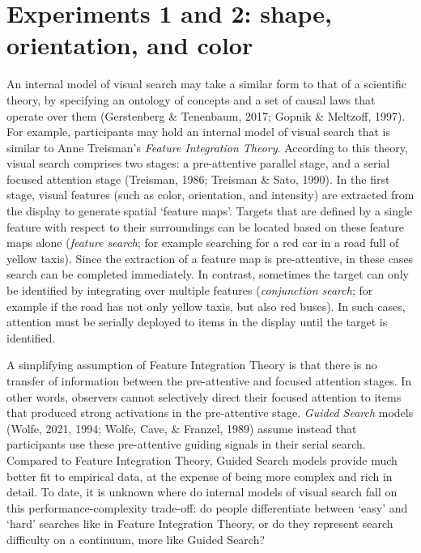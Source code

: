 \documentclass[12pt,twoside]{reedthesis}
\begin{document}
\hypertarget{experiments-1-and-2-shape-orientation-and-color}{%
\section{Experiments 1 and 2: shape, orientation, and color}\label{experiments-1-and-2-shape-orientation-and-color}}

An internal model of visual search may take a similar form to that of a scientific theory, by specifying an ontology of concepts and a set of causal laws that operate over them (Gerstenberg \& Tenenbaum, 2017; Gopnik \& Meltzoff, 1997). For example, participants may hold an internal model of visual search that is similar to Anne Treisman's \emph{Feature Integration Theory}. According to this theory, visual search comprises two stages: a pre-attentive parallel stage, and a serial focused attention stage (Treisman, 1986; Treisman \& Sato, 1990). In the first stage, visual features (such as color, orientation, and intensity) are extracted from the display to generate spatial `feature maps'. Targets that are defined by a single feature with respect to their surroundings can be located based on these feature maps alone (\emph{feature search}; for example searching for a red car in a road full of yellow taxis). Since the extraction of a feature map is pre-attentive, in these cases search can be completed immediately. In contrast, sometimes the target can only be identified by integrating over multiple features (\emph{conjunction search}; for example if the road has not only yellow taxis, but also red buses). In such cases, attention must be serially deployed to items in the display until the target is identified.

A simplifying assumption of Feature Integration Theory is that there is no transfer of information between the pre-attentive and focused attention stages. In other words, observers cannot selectively direct their focused attention to items that produced strong activations in the pre-attentive stage. \emph{Guided Search} models (Wolfe, 2021, 1994; Wolfe, Cave, \& Franzel, 1989) assume instead that participants use these pre-attentive guiding signals in their serial search. Compared to Feature Integration Theory, Guided Search models provide much better fit to empirical data, at the expense of being more complex and rich in detail. To date, it is unknown where do internal models of visual search fall on this performance-complexity trade-off: do people differentiate between `easy' and `hard' searches like in Feature Integration Theory, or do they represent search difficulty on a continuum, more like Guided Search?
\end{document}
